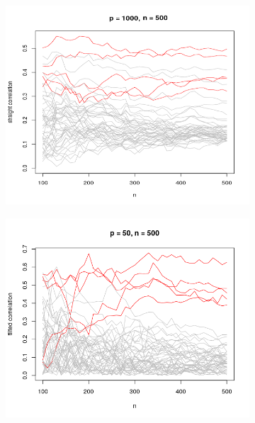 \documentclass[11pt]{report}\usepackage[utf8]{inputenc}
\begin{document}
\begin{landscape}
\begin{figure}
    \begin{subfigure}[b]{0.45\textwidth}
        \includegraphics[width=\textwidth]{../plots/high-dim cor}
        \caption{}
    \end{subfigure}
    \begin{subfigure}[b]{0.45\textwidth}
        \includegraphics[width=\textwidth]{../plots/low-dim tilt}
        \caption{}
    \end{subfigure}
    \begin{subfigure}[b]{0.45\textwidth}

\end{subfigure}
\end{figure}
\end{landscape}
\end{document}
